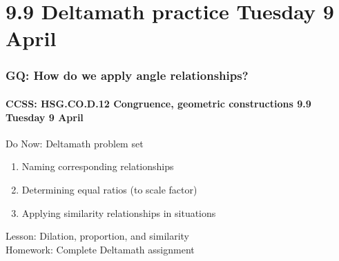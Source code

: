 \documentclass{beamer}
\begin{document}
\section{9.9 Deltamath practice Tuesday 9 April}
  \frame
  {
    \frametitle{GQ: How do we apply angle relationships?}
    \framesubtitle{CCSS: HSG.CO.D.12 Congruence, geometric constructions \hfill \alert{9.9 Tuesday 9 April}}

    \begin{block}{Do Now: Deltamath problem set}
      \begin{enumerate}
        \item Naming corresponding relationships
        \item Determining equal ratios (to scale factor)
        \item Applying similarity relationships in situations
      \end{enumerate}
    \end{block}
    Lesson: Dilation, proportion, and similarity\\
    Homework: Complete Deltamath assignment
  }
\end{document}
